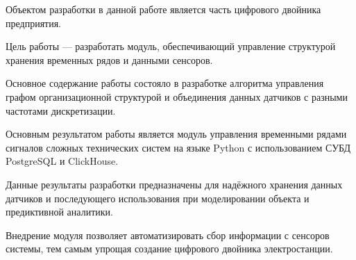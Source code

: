 \abstract %


Объектом разработки в данной работе является часть цифрового двойника предприятия.

Цель работы --- разработать модуль, обеспечивающий управление структурой хранения временных рядов и данными сенсоров.

Основное содержание работы состояло в разработке алгоритма управления графом организационной структурой и объединения данных датчиков с разными частотами дискретизации.

Основным результатом работы является модуль управления временными рядами сигналов сложных технических систем на языке Python с использованием СУБД PostgreSQL и ClickHouse.

Данные результаты разработки предназначены для надёжного хранения данных датчиков и последующего использования при моделировании объекта и предиктивной аналитики.

Внедрение модуля позволяет автоматизировать сбор информации с сенсоров системы, тем самым упрощая создание цифрового двойника электростанции.
